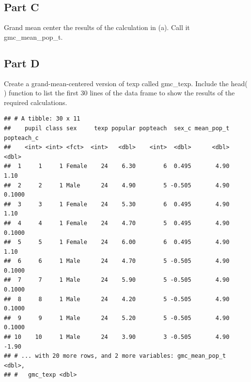 \documentclass[]{article}
\newenvironment{Shaded}{\begin{snugshade}}{\end{snugshade}}
\newcommand{\KeywordTok}[1]{\textcolor[rgb]{0.13,0.29,0.53}{\textbf{#1}}}
\newcommand{\DataTypeTok}[1]{\textcolor[rgb]{0.13,0.29,0.53}{#1}}
\newcommand{\DecValTok}[1]{\textcolor[rgb]{0.00,0.00,0.81}{#1}}
\newcommand{\StringTok}[1]{\textcolor[rgb]{0.31,0.60,0.02}{#1}}
\newcommand{\OperatorTok}[1]{\textcolor[rgb]{0.81,0.36,0.00}{\textbf{#1}}}
\newcommand{\NormalTok}[1]{#1}
\begin{document}
\subsection{Part C}\label{part-c}

Grand mean center the results of the calculation in (a). Call it
gmc\_mean\_pop\_t.

\begin{Shaded}
\end{Shaded}

\subsection{Part D}\label{part-d}

Create a grand-mean-centered version of texp called gmc\_texp. Include
the head( ) function to list the first 30 lines of the data frame to
show the results of the required calculations.

\begin{Shaded}
\end{Shaded}

\begin{verbatim}
## # A tibble: 30 x 11
##    pupil class sex     texp popular popteach  sex_c mean_pop_t popteach_c
##    <int> <int> <fct>  <int>   <dbl>    <int>  <dbl>      <dbl>      <dbl>
##  1     1     1 Female    24    6.30        6  0.495       4.90     1.10  
##  2     2     1 Male      24    4.90        5 -0.505       4.90     0.1000
##  3     3     1 Female    24    5.30        6  0.495       4.90     1.10  
##  4     4     1 Female    24    4.70        5  0.495       4.90     0.1000
##  5     5     1 Female    24    6.00        6  0.495       4.90     1.10  
##  6     6     1 Male      24    4.70        5 -0.505       4.90     0.1000
##  7     7     1 Male      24    5.90        5 -0.505       4.90     0.1000
##  8     8     1 Male      24    4.20        5 -0.505       4.90     0.1000
##  9     9     1 Male      24    5.20        5 -0.505       4.90     0.1000
## 10    10     1 Male      24    3.90        3 -0.505       4.90    -1.90  
## # ... with 20 more rows, and 2 more variables: gmc_mean_pop_t <dbl>,
## #   gmc_texp <dbl>
\end{verbatim}
\end{document}
